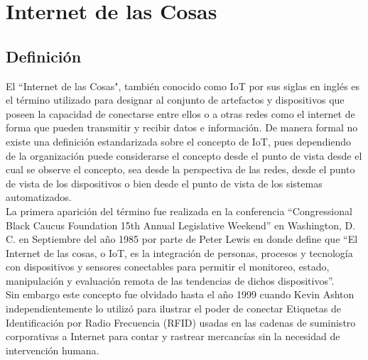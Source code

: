

\chapter{Internet de las Cosas}
\section{Definición}
El ``Internet de las Cosas", también conocido como IoT por sus siglas en inglés es el término utilizado para designar al conjunto de artefactos y dispositivos que poseen la capacidad de conectarse entre ellos o a otras redes como el internet de forma que pueden transmitir y recibir datos e información. De manera formal no existe una definición estandarizada sobre el concepto de IoT, pues dependiendo de la organización puede considerarse el concepto desde el punto de vista desde el cual se observe el concepto, sea desde la perspectiva de las redes, desde el punto de vista de los dispositivos o bien desde el punto de vista de los sistemas automatizados.\\

La primera aparición del término fue realizada en la conferencia ``Congressional Black Caucus Foundation 15th Annual Legislative Weekend'' en Washington, D. C. en Septiembre del año 1985 por parte de Peter Lewis \cite{IoTTrueHistory} en donde define que ``El Internet de las cosas, o IoT, es la integración de personas, procesos y tecnología con dispositivos y sensores conectables para permitir el monitoreo, estado, manipulación y evaluación remota de las tendencias de dichos dispositivos''\cite{IoTFirstDef}.\\

Sin embargo este concepto fue olvidado hasta el año 1999 cuando Kevin Ashton independientemente lo utilizó para ilustrar el poder de conectar Etiquetas de Identificación por Radio Frecuencia (RFID) usadas en las cadenas de suministro corporativas a Internet para contar y rastrear mercancías sin la necesidad de intervención humana\cite{iotInternetSociety}.\\

